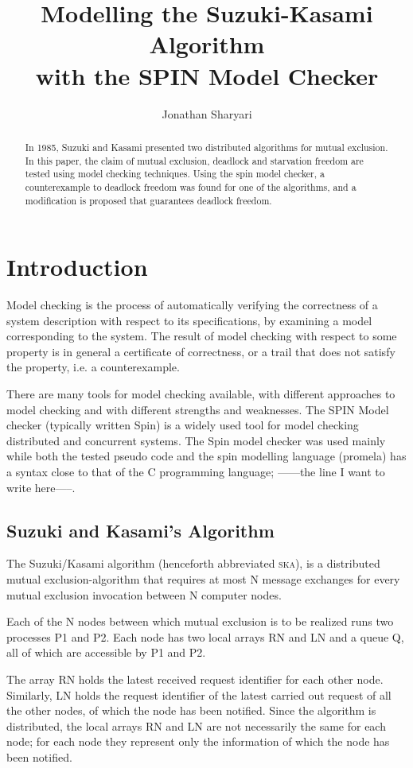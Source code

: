 \documentclass[a4paper,10pt]{llncs}
\title{\textbf{Modelling the Suzuki-Kasami Algorithm\\ with the SPIN Model Checker}}
\author{Jonathan Sharyari}
\institute{Freie Universit{\"a}t Berlin, Computer Science Department\\
Takustra{\ss}e 9. 14195 Berlin, Germany\\
\mailsa
}
\begin{document}
\maketitle


\begin{abstract}
In 1985, Suzuki and Kasami presented two distributed algorithms for mutual exclusion. In this paper, the claim of mutual exclusion, deadlock and starvation freedom are tested using model checking techniques. Using the spin model checker, a counterexample to deadlock freedom was found for one of the algorithms, and a modification is proposed that guarantees deadlock freedom.
\end{abstract}


\section{Introduction}
Model checking is the process of automatically verifying the correctness of a system description with respect to its specifications, by examining a model corresponding to the system. The result of model checking with respect to some property is in general a certificate of correctness, or a trail that does not satisfy the property, i.e. a counterexample.

There are many tools for model checking available, with different approaches to model checking and with different strengths and weaknesses. The SPIN Model checker (typically written Spin) is a widely used tool for model checking distributed and concurrent systems. The Spin model checker was used mainly while both the tested pseudo code and the spin modelling language (promela) has a syntax close to that of the C programming language; ------the line I want to write here-----.


\subsection{Suzuki and Kasami's Algorithm}

The Suzuki/Kasami algorithm\cite{Suzuki} (henceforth abbreviated \textsc{ska}), is a distributed mutual exclusion-algorithm that requires at most N message exchanges for every mutual exclusion invocation between N computer nodes.

Each of the N nodes between which mutual exclusion is to be realized runs two processes P1 and P2. Each node has two local arrays RN and LN and a queue Q, all of which are accessible by P1 and P2.

The array RN holds the latest received request identifier for each other node. Similarly, LN holds the request identifier of the latest carried out request of all the other nodes, of which the node has been notified. Since the algorithm is distributed, the local arrays RN and LN are not necessarily the same for each node; for each node they represent only the information of which the node has been notified.
\end{document}

